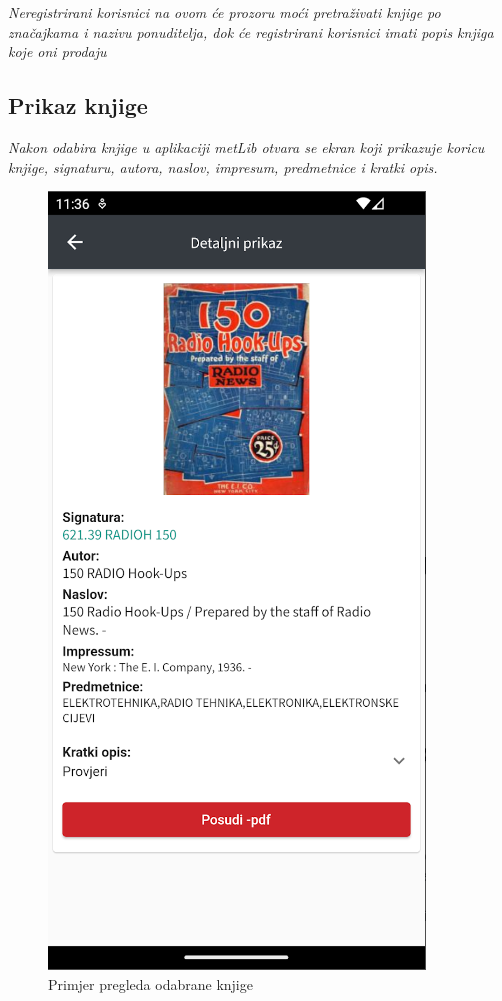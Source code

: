 	\textit{Neregistrirani korisnici na ovom će prozoru moći pretraživati knjige po značajkama i nazivu ponuditelja, dok će registrirani korisnici imati popis knjiga koje oni prodaju}
	
	\subsection{Prikaz knjige}
	
	\textit{Nakon odabira knjige u aplikaciji metLib otvara se ekran koji prikazuje koricu knjige, signaturu, autora, naslov, impresum, predmetnice i kratki opis.} 
	
	\begin{figure}[H]
		\includegraphics[scale=0.4]{slike/BookScreen.PNG} %
		\centering
		\caption{Primjer pregleda odabrane knjige}
		\label{fig:prozor knjige}
	\end{figure}
		

